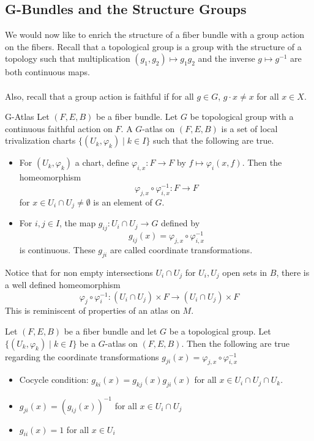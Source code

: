 \documentclass[a4paper]{article}
\begin{document}
\subsection{G-Bundles and the Structure Groups}
We would now like to enrich the structure of a fiber bundle with a group action on the fibers. Recall that a topological group is a group with the structure of a topology such that multiplication $(g_1,g_2)\mapsto g_1g_2$ and the inverse $g\mapsto g^{-1}$ are both continuous maps. \\~\\

Also, recall that a group action is faithful if for all $g\in G$, $g\cdot x\neq x$ for all $x\in X$. 

\begin{defn}{G-Atlas}{} Let $(F,E,B)$ be a fiber bundle. Let $G$ be topological group with a continuous faithful action on $F$. A $G$-atlas on $(F,E,B)$ is a set of local trivalization charts $\{(U_k,\varphi_k)\;|\;k\in I\}$ such that the following are true. 
\begin{itemize}
\item For $(U_k,\varphi_k)$ a chart, define $\varphi_{i,x}:F\to F$ by $f\mapsto\varphi_i(x,f)$. Then the homeomorphism $$\varphi_{j,x}\circ\varphi_{i,x}^{-1}:F\to F$$ for $x\in U_i\cap U_j\neq\emptyset$ is an element of $G$. 
\item For $i,j\in I$, the map $g_{ij}:U_i\cap U_j\to G$ defined by $$g_{ij}(x)=\varphi_{j,x}\circ\varphi_{i,x}^{-1}$$ is continuous. These $g_{ji}$ are called coordinate transformations. 
\end{itemize}
\end{defn}

Notice that for non empty intersections $U_i\cap U_j$ for $U_i,U_j$ open sets in $B$, there is a well defined homeomorphism $$\varphi_j\circ\varphi_i^{-1}:(U_i\cap U_j)\times F\to(U_i\cap U_j)\times F$$ This is reminiscent of properties of an atlas on $M$. 

\begin{lmm}{}{} Let $(F,E,B)$ be a fiber bundle and let $G$ be a topological group. Let $\{(U_k,\varphi_k)\;|\;k\in I\}$ be a $G$-atlas on $(F,E,B)$. Then the following are true regarding the coordinate transformations $g_{ji}(x)=\varphi_{j,x}\circ\varphi_{i,x}^{-1}$
\begin{itemize}
\item Cocycle condition: $g_{ki}(x)=g_{kj}(x)g_{ji}(x)$ for all $x\in U_i\cap U_j\cap U_k$. 
\item $g_{ji}(x)=(g_{ij}(x))^{-1}$ for all $x\in U_i\cap U_j$
\item $g_{ii}(x)=1$ for all $x\in U_i$
\end{itemize}
\end{lmm}
\end{document}
